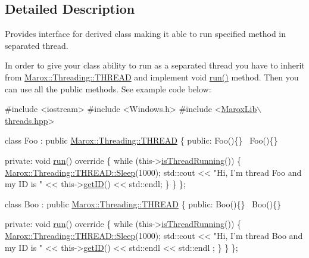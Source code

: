 \subsection{Detailed Description}
Provides interface for derived class making it able to run specified method in separated thread. 

In order to give your class ability to run as a separated thread you have to inherit from {\ttfamily \hyperlink{class_marox_1_1_threading_1_1_t_h_r_e_a_d}{Marox\+::\+Threading\+::\+T\+H\+R\+E\+A\+D}} and implement {\ttfamily void \hyperlink{class_marox_1_1_threading_1_1_t_h_r_e_a_d_ab7177d6c63517e76422a4a9c22069346}{run()}} method. Then you can use all the public methods. See example code below\+: 


\begin{DoxyCode}
\textcolor{preprocessor}{#include <iostream>}
\textcolor{preprocessor}{#include <Windows.h>}
\textcolor{preprocessor}{#include <\hyperlink{threads_8hpp}{MaroxLib\(\backslash\)threads.hpp}>}

\textcolor{keyword}{class }Foo : \textcolor{keyword}{public} \hyperlink{class_marox_1_1_threading_1_1_t_h_r_e_a_d}{Marox::Threading::THREAD}
\{
\textcolor{keyword}{public}:
    Foo()\{\}
    ~Foo()\{\}

\textcolor{keyword}{private}:
    \textcolor{keywordtype}{void} \hyperlink{class_marox_1_1_threading_1_1_t_h_r_e_a_d_ab7177d6c63517e76422a4a9c22069346}{run}()\textcolor{keyword}{ override}
\textcolor{keyword}{    }\{
        \textcolor{keywordflow}{while} (this->\hyperlink{class_marox_1_1_threading_1_1_t_h_r_e_a_d_abb2bf027b066903e4dd5a9fb20948310}{isThreadRunning}())
        \{
             \hyperlink{class_marox_1_1_threading_1_1_t_h_r_e_a_d_a70b477f43d1c876405f8ed53d7b0f468}{Marox::Threading::THREAD::Sleep}(1000);
            std::cout << \textcolor{stringliteral}{"Hi, I'm thread Foo and my ID is "} << this->\hyperlink{class_marox_1_1_threading_1_1_t_h_r_e_a_d_a0c70c64d79b5063fe22023359dc13571}{getID}() << std::endl;
        \}
    \}
\};

\textcolor{keyword}{class }Boo : \textcolor{keyword}{public} \hyperlink{class_marox_1_1_threading_1_1_t_h_r_e_a_d}{Marox::Threading::THREAD}
\{
\textcolor{keyword}{public}:
    Boo()\{\}
    ~Boo()\{\}

\textcolor{keyword}{private}:
    \textcolor{keywordtype}{void} \hyperlink{class_marox_1_1_threading_1_1_t_h_r_e_a_d_ab7177d6c63517e76422a4a9c22069346}{run}()\textcolor{keyword}{ override}
\textcolor{keyword}{    }\{
        \textcolor{keywordflow}{while} (this->\hyperlink{class_marox_1_1_threading_1_1_t_h_r_e_a_d_abb2bf027b066903e4dd5a9fb20948310}{isThreadRunning}())
        \{
             \hyperlink{class_marox_1_1_threading_1_1_t_h_r_e_a_d_a70b477f43d1c876405f8ed53d7b0f468}{Marox::Threading::THREAD::Sleep}(1000);
            std::cout << \textcolor{stringliteral}{"Hi, I'm thread Boo and my ID is "} << this->\hyperlink{class_marox_1_1_threading_1_1_t_h_r_e_a_d_a0c70c64d79b5063fe22023359dc13571}{getID}() << std::endl << std::endl
      ;
        \}
    \}
\};


\end{DoxyCode}
